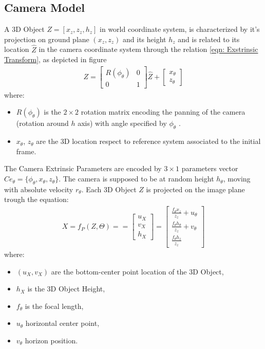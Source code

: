 \subsection{Camera Model}
A 3D Object  $Z= [x_z, z_z, h_z]$ in world coordinate system, is characterized by it's projection on ground plane $(x_z, z_z)$ and its height $h_z$ and is related to its location $\hat{Z}$ in the camera coordinate system through the relation \ref{eqn: Exstrinsic Transform}, as depicted in figure
\begin{eqnarray} \label{eqn: Exstrinsic Transform}
Z= \left[ 
\begin{array}{cc}
R(\phi_{\theta} ) & 0 \\
0 & 1
\end{array} 
\right] \hat{Z} +
\left[ 
\begin{array}{c}
x_{\theta} \\
z_{\theta}
\end{array}
\right]
\end{eqnarray}
where:
\begin{itemize}
\item $R(\phi_{\theta})$ is the $2\times2$ rotation matrix encoding the panning of the camera (rotation around $h$ axis) with angle specified by $\phi_{\theta}$ .
\item $x_{\theta}$, $z_{\theta}$ are the 3D location respect to reference system associated to the initial frame.
\end{itemize}
The Camera Extrinsic Parameters are encoded by $3\times1$ parameters vector $Ce_{\theta}=\{\phi_{\theta}, x_{\theta}, z_{\theta}\}$.
The camera is supposed to be at random height $h_{\theta}$,  moving with absolute velocity $r_{\theta}$. 
Each 3D Object $Z$ is projected on the image plane trough the equation: 
\begin{eqnarray} \label{eqn: Perspective Projection}
X=f_P(Z,\Theta)=
= \left[
\begin{array}{c}
u_X \\
v_X\\
h_X
\end{array}
\right]
= \left[
\begin{array}{c}
\frac{f_{\theta} x_z}{z_z} +u_{\theta} \\
\frac{f_{\theta} h_{\theta}}{z_z} +v_{\theta} \\
\frac{f_{\theta} h_z}{z_z}
\end{array}
\right]
\end{eqnarray}
where:
\begin{itemize}
\item $(u_X,v_X)$ are the bottom-center point location of the 3D Object,
\item $h_X$ is the 3D Object Height,
\item $f_{\theta}$ is the focal length,
\item $u_{\theta}$ horizontal center point,
\item $v_{\theta}$ horizon position.
\end{itemize}
